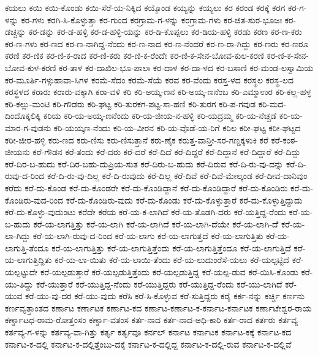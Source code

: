ಕಯಲು
ಕಯಿ
ಕಯಿ-ಕೊಂಡು
ಕಯಿ-ಸೆರೆ-ಯ-ನಿಕ್ಕಿದ
ಕಯ್ಕೊಂಡ
ಕಯ್ಯನ್ನು
ಕಯ್ಯಲು
ಕರ
ಕರಂಡ
ಕರಕ್ಕೆ
ಕರಗ
ಕರ-ಗ-ಳನ್ನು
ಕರ-ಗಳು
ಕರಗಿ-ಸಿ-ಕೊಳ್ಳುತ್ತಾ
ಕರ-ಗುಂದ
ಕರಗ್ರಾಮ-ಗ-ಳನ್ನು
ಕರಗ್ರಾಮ-ಗಳು
ಕರ-ಜಿತ-ಸುರ-ಭೂಜಃ
ಕರ-ಡಚ್ಚನ್ನು
ಕರ-ಡನ್ನು
ಕರ-ಡ-ಹಳ್ಳಿ
ಕರ-ಡ-ಹಳ್ಳಿ-ಯನ್ನು
ಕರ-ಡಿ-ಕೊಪ್ಪಲು
ಕರ-ಡಿಯ-ಹಳ್ಳಿ
ಕರಡು
ಕರಣ
ಕರ-ಣ-ಕರು
ಕರ-ಣ-ಗಳು
ಕರ-ಣದ
ಕರ-ಣ-ನಾಗಿದ್ದ-ನೆಂದು
ಕರ-ಣ-ನಾದ
ಕರ-ಣ-ನೆಂದರೆ
ಕರ-ಣ-ರಾ-ಗಿದ್ದು
ಕರ-ಣರು
ಕರ-ಣರೂ
ಕರಣಿ
ಕರ-ಣಿಕ
ಕರ-ಣಿ-ಕ-ರಾದ
ಕರ-ಣಿ-ಕರು
ಕರ-ಣಿ-ಕ-ರೆಂದೇ
ಕರ-ಣಿ-ಕ-ಸೇನ-ಬೋವ-ಕುಲ-ಕರಣಿ
ಕರ-ಣಿ-ಕ-ಸೇನ-ಬೋವ-ಕುಳ-ಕರಣಿ
ಕರ-ತಾಳ
ಕರ-ದಾಖಿಲ-ಭೂ-ಪಾಲಃ
ಕರ-ದಾಳ
ಕರ-ದಾ-ಳದ
ಕರ-ಬಸಾಣಿ
ಕರ-ಮಂಡ-ಲಸ್ವಾಮಿಯ
ಕರ-ಮೂರ್ತಿ-ಗಳ್ಗುಹಾವಾ-ಸಿಗಳ
ಕರಮೆ-ಸೆದಂ
ಕರಮೆ-ಸೆಯೆ
ಕರವ
ಕರ-ವೆಂದು
ಕರಸ್ತ-ಳದ
ಕರಸ್ಥಲ
ಕರಸ್ಥ-ಲದ
ಕರಸ್ಥಳದ
ಕರಾರು
ಕರಾರು-ವಕ್ಕಾಗಿ
ಕರಾ-ವಳಿ
ಕರಿ
ಕರಿ-ಅಯ್ಕ-ಣನ
ಕರಿ-ಅಯ್ಕ-ಣನೆಂಬ
ಕರಿ-ಎಮ್ಮಾಉರ
ಕರಿ-ಕಲ್ಲ-ಹಳ್ಳ
ಕರಿ-ಕಲ್ಲು-ಮಂಟಿ
ಕರಿ-ಗೌಡರು
ಕರಿ-ಘಟ್ಟ
ಕರಿ-ತುರಕಗ-ಪಟ್ಟ-ಸಾ-ಹಣಿ
ಕರಿ-ತುರಗ
ಕರಿ-ಪ-ಗವುಡ
ಕರಿ-ಮದ-ದಿಂದೊಕ್ಕಲಿಕ್ಕಿ
ಕರಿಯ
ಕರಿ-ಯ-ಅಯ್ಕ-ಣನೆಂದು
ಕರಿ-ಯ-ಜೀಯ-ನ-ಹಳ್ಳಿ
ಕರಿ-ಯದ್ರಮ್ಮ
ಕರಿ-ಯ-ನೆಚ್ಚಡೆ
ಕರಿ-ಯ-ಮಾರ-ಗ-ವುಡನು
ಕರಿ-ಯಯ್ಕಣ-ನೆಂದು
ಕರಿ-ಯ-ವೀರನ
ಕರಿ-ಯ-ವೊಡೆ-ಯ-ರಿಗೆ
ಕರಿಲ
ಕರೀ-ಘಟ್ಟ
ಕರೀ-ಘಟ್ಟದ
ಕರೀ-ಜೀರ-ಹಳ್ಳಿ
ಕರು-ಣದ
ಕರು-ಣಿಸು
ಕರು-ಣಿಸುತ್ತಾನೆ
ಕರು-ಣೈಕ
ಕರುತ್ತ-ವಾನ್ತೀ-ಸರ-ಗಣ್ಡಕ್ಕಳುಕಿ
ಕರೆ
ಕರೆ-ಕಂಠ-ಜೀಯನು
ಕರೆ-ಗೌಡನ
ಕರೆ-ತಂದು
ಕರೆ-ದರು
ಕರೆ-ದರೆ
ಕರೆ-ದಿದೆ
ಕರೆ-ದಿದ್ದರೆ
ಕರೆ-ದಿದ್ದಾನೆ
ಕರೆ-ದಿದ್ದಾರೆ
ಕರೆ-ದಿದ್ದು
ಕರೆ-ದಿರ-ಬ-ಹುದು
ಕರೆ-ದಿರ-ಬಹು-ದುಪ್ರಿಯ-ಸುತ
ಕರೆ-ದಿರು-ಬ-ಹುದು
ಕರೆ-ದಿರುವ
ಕರೆ-ದಿ-ರು-ವು-ದನ್ನು
ಕರೆ-ದಿ-ರುವು-ದ-ರಿಂದ
ಕರೆ-ದಿ-ರು-ವು-ದಿಲ್ಲ
ಕರೆ-ದಿ-ರುವುದು
ಕರೆ-ದಿಲ್ಲ
ಕರೆ-ದಿವೆ
ಕರೆ-ದಿವೆ-ಮೇಲ್ಕಂಡ
ಕರೆ-ದೀವ-ದಾನಿವುಂ
ಕರೆದು
ಕರೆ-ದು-ಕೊಂಡ
ಕರೆ-ದು-ಕೊಂಡರೇ
ಕರೆ-ದು-ಕೊಂಡಿದ್ದಾನೆ
ಕರೆ-ದು-ಕೊಂಡಿದ್ದಾರೆ
ಕರೆ-ದು-ಕೊಂಡಿರು
ಕರೆ-ದು-ಕೊಂಡಿರು-ವುದ-ರಿಂದ
ಕರೆ-ದು-ಕೊಂಡಿರು-ವುದು
ಕರೆ-ದು-ಕೊಂಡು
ಕರೆ-ದು-ಕೊಳ್ಳುತ್ತಾರೆ
ಕರೆ-ದು-ಕೊಳ್ಳುತ್ತಿದ್ದುದು
ಕರೆ-ದು-ಕೊಳ್ಳು-ವುದುಂಟು
ಕರೆದೇ
ಕರೆಯ
ಕರೆ-ಯ-ಕ-ಲಾಗಿದೆ
ಕರೆ-ಯ-ತೊಡಗಿ-ದರು
ಕರೆ-ಯತ್ತಿದ್ದ-ರೆಂದು
ಕರೆ-ಯ-ಬ-ಹುದು
ಕರೆ-ಯ-ಲಾಗತ್ತಿತ್ತು
ಕರೆ-ಯ-ಲಾಗಿ
ಕರೆ-ಯ-ಲಾಗಿದೆ
ಕರೆ-ಯ-ಲಾಗಿ-ದೆಯೇ
ಕರೆ-ಯ-ಲಾಗಿ-ದೆೆ
ಕರೆ-ಯ-ಲಾ-ಗಿದ್ದು
ಕರೆ-ಯ-ಲಾಗಿ-ರುವು-ದ-ರಿಂದ
ಕರೆ-ಯ-ಲಾಗು
ಕರೆ-ಯ-ಲಾಗುತ್ತದೆ
ಕರೆ-ಯ-ಲಾಗುತ್ತಿತು
ಕರೆ-ಯ-ಲಾಗುತ್ತಿ-ತೆಂದೂ
ಕರೆ-ಯ-ಲಾಗುತ್ತಿತ್ತು
ಕರೆ-ಯ-ಲಾಗುತ್ತಿತ್ತೆಂದು
ಕರೆ-ಯ-ಲಾಗುತ್ತಿತ್ತೆಂದೂ
ಕರೆ-ಯ-ಲಾಗುತ್ತಿದೆ
ಕರೆ-ಯ-ಲಾಗುತ್ತಿದ್ದಿತು
ಕರೆ-ಯ-ಲಾ-ಯಿತು
ಕರೆ-ಯ-ಲಾಯಿ-ತೆಂದು
ಕರೆ-ಯ-ಲುದುಂರೆಸೆ-ಯಲು
ಕರೆ-ಯಲ್ಪಟ್ಟಿದೆ
ಕರೆ-ಯಲ್ಪಟ್ಟುದೇ
ಕರೆ-ಯಲ್ಪಡುತ್ತಾರೆ
ಕರೆ-ಯಲ್ಪಡುತ್ತಿತ್ತೆಂದು
ಕರೆ-ಯಲ್ಪಡುತ್ತಿದ್ದ
ಕರೆ-ಯಲ್ಪ-ಡುವ
ಕರೆ-ಯಿಸಿ-ಕೊಂಡು
ಕರೆ-ಯು-ತಿದ್ದು
ಕರೆ-ಯುತ್ತಾರೆ
ಕರೆ-ಯುತ್ತಿದ್ದ-ನೆಂದು
ಕರೆ-ಯುತ್ತಿದ್ದರು
ಕರೆ-ಯುತ್ತಿದ್ದ-ರೆಂದು
ಕರೆ-ಯು-ಲಾಗಿದೆ
ಕರೆ-ಯುವ
ಕರೆ-ಯು-ವು-ದರ
ಕರೆ-ಯು-ವುದು
ಕರೆಸಿ
ಕರೆ-ಸಿ-ಕೊಳ್ಳುವ
ಕರೆ-ಸುತ್ತಿದ್ದರು
ಕರೈ
ಕರ್ಕ-ನನ್ನು
ಕರ್ಚ್ಚಿ
ಕರ್ಣನು
ಕರ್ಣವೃತ್ತಾಂತದ
ಕರ್ಣಾಟ
ಕರ್ಣಾಟಕ
ಕರ್ಣಾಟ-ಕದ
ಕರ್ಣಾಟ-ಕರ್ಣಾಟ-ಕ-ಕರ್ನಾಟ-ಕರ್ನಾಟಕ
ಕರ್ಣಾಟೇಶ್ವರ-ರಾಯ
ಕರ್ಣ್ನಾಟಧ-ರಾಮ-ರೋತ್ತಂಸಂ
ಕರ್ಣ್ನಾ-ವತಂಸ
ಕರ್ತ-ನಾದ
ಕರ್ತ-ನಾದ-ಅಧಿ-ಕಾರಿ
ಕರ್ತ-ರಾದ
ಕರ್ತರು
ಕರ್ತವ್ಯ
ಕರ್ತವ್ಯ-ಗ-ಳನ್ನು
ಕರ್ತವ್ಯ-ವಾ-ಗಿತ್ತು
ಕರ್ತೃ
ಕರ್ತೃವೂ
ಕರ್ನಲ್
ಕರ್ನಾಟ
ಕರ್ನಾಟಕ
ಕರ್ನಾಟ-ಕಕ್ಕೆ
ಕರ್ನಾಟ-ಕದ
ಕರ್ನಾಟ-ಕ-ದಲ್ಲಿ
ಕರ್ನಾಟ-ಕ-ದಲ್ಲಿತ್ತೆಂಬು-ದಕ್ಕೆ
ಕರ್ನಾಟ-ಕ-ದಲ್ಲಿದ್ದ
ಕರ್ನಾಟ-ಕ-ದಲ್ಲಿ-ರುವ
ಕರ್ನಾಟ-ಕ-ದಲ್ಲಿವೆ
